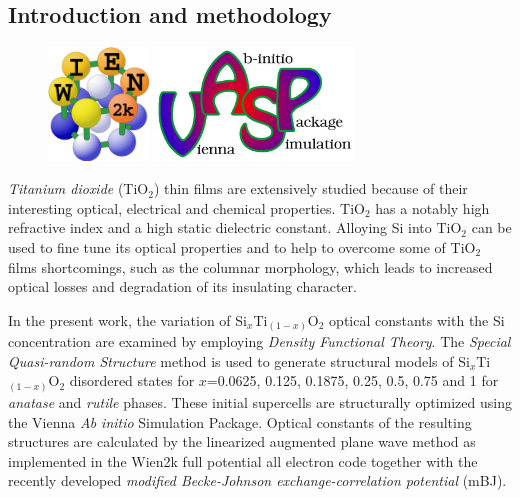 \documentclass[blues]{poster}
\begin{document}
\begin{multicols}{2}

\subsection{Introduction and methodology }

\begin{figure}
  \vspace{-20pt}
  \begin{center}
    \includegraphics[height=3cm]{WIEN2k-logo.jpg}
    \includegraphics[height=3cm]{VASP-logo.jpg}
  \end{center}
  \vspace{-20pt}
\end{figure}

\emph{Titanium dioxide} (TiO$_2$) thin films are extensively studied because of their interesting optical, electrical and
chemical properties. TiO$_2$ has a notably high refractive index and a high static dielectric constant. 
Alloying Si into TiO$_2$ can be used to fine tune its optical properties and to help to overcome some of TiO$_2$ films shortcomings, such as the columnar morphology, which leads to increased optical losses and degradation of its insulating character.

In the present work, the variation of Si$_x$Ti$_{(1-x)}$O$_2$ optical constants with the Si concentration are examined by employing \emph{Density Functional Theory}. 
The \emph{Special Quasi-random Structure} method is used to generate structural models of Si$_x$Ti$_{(1-x)}$O$_2$ disordered states for $x$=0.0625, 0.125, 0.1875, 0.25, 0.5, 0.75 and 1 for \emph{anatase} and \emph{rutile} phases. These initial supercells are structurally optimized using the Vienna \textit{Ab initio} Simulation Package. 
Optical constants of the resulting structures are calculated by the linearized augmented plane wave method as implemented in the Wien2k full potential all electron code together with the recently developed \emph{modified Becke-Johnson exchange-correlation potential} (mBJ).


\end{multicols}
\end{document}
